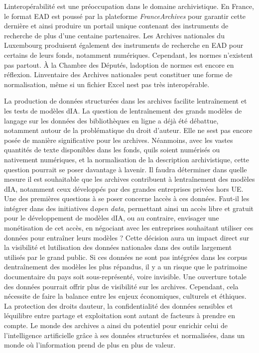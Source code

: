 	L\textquotesingle interopérabilité est
	une préoccupation dans le domaine archivistique. En France, le format
	EAD est poussé par la plateforme \emph{FranceArchives} pour
	garantir cette dernière et ainsi produire un portail unique contenant
	des instruments de recherche de plus d'une centaine partenaires. Les
	Archives nationales du Luxembourg produisent également des instruments
	de recherche en EAD pour certains de leurs fonds, notamment
	numériques. Cependant, les normes n'existent pas partout. À la Chambre
	des Députés, l\textquotesingle adoption de normes est encore en
	réflexion. L\textquotesingle inventaire des Archives nationales peut
	constituer une forme de normalisation, même si un fichier Excel
	n\textquotesingle est pas très interopérable.
	
	La production de données structurées dans les archives facilite 
	l\textquotesingle entraînement et les tests de modèles
	d\textquotesingle IA. La question de l\textquotesingle entraînement des
	grands modèles de langage sur les données des bibliothèques en ligne a
	déjà été débattue, notamment autour de la problématique du droit
	d'auteur. Elle ne s\textquotesingle est pas encore posée de manière
	significative pour les archives. Néanmoins, avec les vastes quantités de
	texte disponibles dans les fonds, qu\textquotesingle ils soient
	numérisés ou nativement numériques, et la normalisation de la
	description archivistique, cette question pourrait se poser davantage à
	l\textquotesingle avenir. Il faudra déterminer dans quelle mesure il est
	souhaitable que les archives contribuent à
	l\textquotesingle entraînement des modèles d\textquotesingle IA,
	notamment ceux développés par des grandes entreprises privées hors UE. Une des
	premières questions à se poser concerne l\textquotesingle accès à ces
	données. Faut-il les intégrer dans des initiatives
	d\textquotesingle \emph{open data}, permettant ainsi un accès libre et gratuit
	pour le développement de modèles d\textquotesingle IA, ou au contraire,
	envisager une monétisation de cet accès, en négociant avec les
	entreprises souhaitant utiliser ces données pour entraîner leurs modèles
	? Cette décision aura un impact direct sur la visibilité et
	l\textquotesingle utilisation des données nationales dans des outils
	largement utilisés par le grand public. Si ces données ne sont pas
	intégrées dans les corpus d\textquotesingle entraînement des modèles les
	plus répandus, il y a un risque que le patrimoine documentaire du pays
	soit sous-représenté, voire invisible. Une ouverture totale des données
	pourrait offrir plus de visibilité sur les archives. Cependant, cela
	nécessite de faire la balance entre les enjeux économiques, culturels et
	éthiques. La protection des droits d\textquotesingle auteur, la
	confidentialité des données sensibles et l\textquotesingle équilibre
	entre partage et exploitation sont autant de facteurs à prendre en
	compte. Le monde des archives a ainsi du potentiel pour enrichir celui de
	l'intelligence artificielle grâce à ses données structurées et
	normalisées, dans un monde où l'information prend de plus en plus de
	valeur.
	

